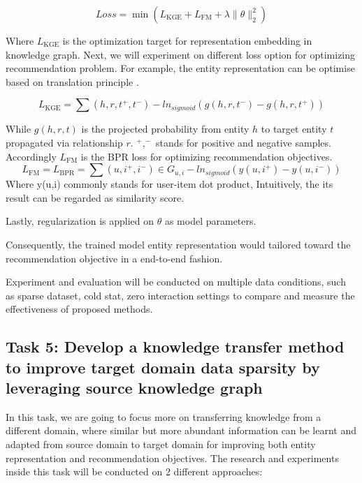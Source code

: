 \begin{equation}
    Loss=\min{(L_\text{KGE}+L_\text{FM}+\lambda\|\theta\|^2_2)}
\end{equation}

Where $L_\text{KGE}$ is the optimization target for representation embedding in knowledge graph. Next, we will experiment on different loss option for optimizing recommendation problem. For example, the entity representation can be optimise based on translation principle \citep{lin2017learning}.

\begin{equation}
    L_\text{KGE}=\sum{(h,r,t^+,t^-)} -ln_{sigmoid}(g(h,r,t^-)-g(h,r,t^+))
\end{equation}

While $g(h,r,t)$ is the projected probability from entity $h$ to target entity $t$ propagated via relationship $r$. $^+,^-$ stands for positive and negative samples. Accordingly $L_\text{FM}$ is the BPR \citep{rendle2012bpr} loss for optimizing recommendation objectives.
\begin{equation}
    L_\text{FM} = L_\text{BPR}=\sum{(u,i^+,i^-) \in G_{u,i}} -ln_{sigmoid}(y(u,i^+)-y(u,i^-))
\end{equation}
Where y(u,i) commonly stands for user-item dot product, Intuitively, the its result can be regarded as similarity score.

Lastly, regularization is applied on $\theta$ as model parameters.

Consequently, the trained model entity representation would tailored toward the recommendation objective in a end-to-end fashion.

Experiment and evaluation will be conducted on multiple data conditions, such as sparse dataset, cold stat, zero interaction settings to compare and measure the effectiveness of proposed methods.


\subsection*{Task 5: Develop a knowledge transfer method to improve target domain data sparsity by leveraging source knowledge graph}

In this task, we are going to focus more on transferring knowledge from a different domain, where similar but more abundant information can be learnt and adapted from source domain to target domain for improving both entity representation and recommendation objectives. The research and experiments inside this task will be conducted on 2 different approaches:

